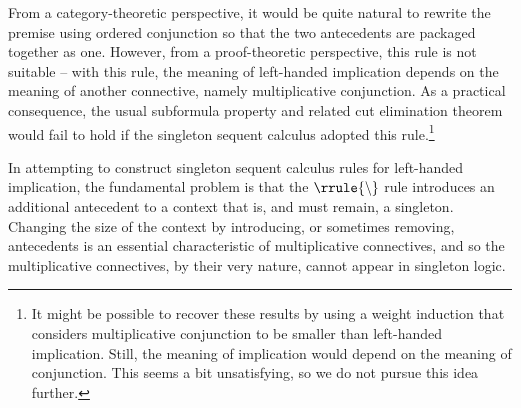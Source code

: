 From a category-theoretic perspective, it would be quite natural to rewrite the premise using ordered conjunction so that the two antecedents are packaged together as one.
% 
However, from a proof-theoretic perspective, this rule is not suitable -- with this rule, the meaning of left-handed implication depends on the meaning of another connective, namely multiplicative conjunction.
As a practical consequence, the usual subformula property and related cut elimination theorem would fail to hold if the singleton sequent calculus adopted this rule.\footnote[][\baselineskip]{It might be possible to recover these results by using a weight induction that considers multiplicative conjunction to be smaller than left-handed implication.
Still, the meaning of implication would depend on the meaning of conjunction.
This seems a bit unsatisfying, so we do not pursue this idea further.}

In attempting to construct singleton sequent calculus rules for left-handed implication, the fundamental problem is that the $\rrule{\limp}$ rule introduces an additional antecedent to a context that is, and must remain, a singleton.
Changing the size of the context by introducing, or sometimes removing, antecedents is an essential characteristic of multiplicative connectives, and so the multiplicative connectives, by their very nature, cannot appear in singleton logic.









